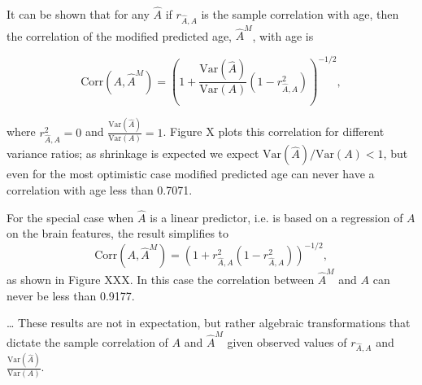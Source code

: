 \documentclass[40pt]{article}
\begin{document}




\hrulefill \\

It can be shown that for any $\hat{A}$ if $r_{\hat{A},A}$ is the sample correlation with age, then the correlation of the modified predicted age, $\hat{A}^M$, with age is

$$
\text{Corr}(A,\hat{A}^M)= \left(1 + \frac{\text{Var}(\hat{A})}{\text{Var}(A)}(1-r_{\hat{A},A}^2)\right)^{-1/2},
$$


\noindent where $r_{\hat{A},A}^2= 0$ and $\frac{\text{Var}(\hat{A})}{\text{Var}(A)} = 1$. Figure X plots this correlation for different variance ratios; as shrinkage is expected we expect $\text{Var}(\hat{A})/\text{Var}(A) < 1$, but even for the most optimistic case modified predicted age can never have a correlation with age less than 0.7071. 


For the special case when $\hat{A}$ is a linear predictor, i.e. is based on a regression of $A$ on the brain features, the result simplifies to
$$
\text{Corr}(A,\hat{A}^M)= \left(1 + r_{\hat{A},A}^2(1-r_{\hat{A},A}^2)\right)^{-1/2},
$$
as shown in Figure XXX. In this case the correlation between $\hat{A}^M$ and $A$ can never be less than 0.9177.

\dots
These results are not in expectation, but rather algebraic transformations that dictate the sample correlation of $A$ and $\hat{A}^M$ given observed values of $r_{\hat{A},A}$ and $\frac{\text{Var}(\hat{A})}{\text{Var}(A)}$.
\end{document}
